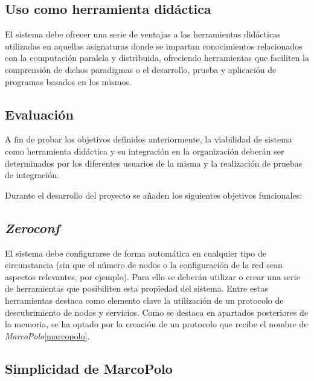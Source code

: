 \subsection{Uso como herramienta didáctica}

El sistema debe ofrecer una serie de ventajas a las herramientas didácticas utilizadas en aquellas asignaturas donde se impartan conocimientos relacionados con la computación paralela y distribuida, ofreciendo herramientas que faciliten la comprensión de dichos paradigmas o el desarrollo, prueba y aplicación de programas basados en los mismos.


\subsection{Evaluación}

A fin de probar los objetivos definidos anteriormente, la viabilidad de sistema como herramienta didáctica y su integración en la organización deberán ser determinados por los diferentes usuarios de la misma y la realización de pruebas de integración.

Durante el desarrollo del proyecto se añaden los siguientes objetivos funcionales:

\subsection{\textit{Zeroconf}}

El sistema debe configurarse de forma automática en cualquier tipo de circunstancia (sin que el número de nodos o la configuración de la red sean aspectos relevantes, por ejemplo). Para ello se deberán utilizar o crear una serie de herramientas que posibiliten esta propiedad del sistema. Entre estas herramientas destaca como elemento clave la utilización de un protocolo de descubrimiento de nodos y servicios. Como se destaca en apartados posteriores de la memoria, se ha optado por la creación de un protocolo que recibe el nombre de \textit{MarcoPolo}\ref{marcopolo}\citationneeded[].

\subsection{Simplicidad de MarcoPolo}

